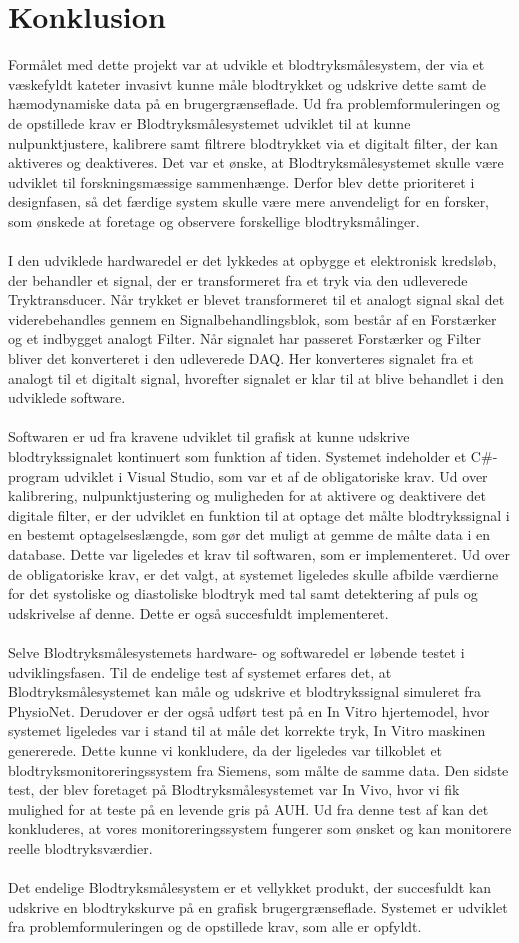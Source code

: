 \chapter{Konklusion}
Formålet med dette projekt var at udvikle et blodtryksmålesystem, der via et væskefyldt kateter invasivt kunne måle blodtrykket og udskrive dette samt de hæmodynamiske data på en brugergrænseflade. Ud fra problemformuleringen og de opstillede krav er Blodtryksmålesystemet udviklet til at kunne nulpunktjustere, kalibrere samt filtrere blodtrykket via et digitalt filter, der kan aktiveres og deaktiveres. 
Det var et ønske, at Blodtryksmålesystemet skulle være udviklet til forskningsmæssige sammenhænge. Derfor blev dette prioriteret i designfasen, så det færdige system skulle være mere anvendeligt for en forsker, som ønskede at foretage og observere forskellige blodtryksmålinger.\\\\
I den udviklede hardwaredel er det lykkedes at opbygge et elektronisk kredsløb, der behandler et signal, der er transformeret fra et tryk via den udleverede Tryktransducer. Når trykket er blevet transformeret til et analogt signal skal det viderebehandles gennem en Signalbehandlingsblok, som består af en Forstærker og et indbygget analogt Filter. Når signalet har passeret Forstærker og Filter bliver det konverteret i den udleverede DAQ. Her konverteres signalet fra et analogt til et digitalt signal, hvorefter signalet er klar til at blive behandlet i den udviklede software. \\\\
Softwaren er ud fra kravene udviklet til grafisk at kunne udskrive blodtrykssignalet kontinuert som funktion af tiden. Systemet indeholder et C\#-program udviklet i Visual Studio, som var et af de obligatoriske krav. Ud over kalibrering, nulpunktjustering og muligheden for at aktivere og deaktivere det digitale filter, er der udviklet en funktion til at optage det målte blodtrykssignal i en bestemt optagelseslængde, som gør det muligt at gemme de målte data i en database. Dette var ligeledes et krav til softwaren, som er implementeret. Ud over de obligatoriske krav, er det valgt, at systemet ligeledes skulle afbilde værdierne for det systoliske og diastoliske blodtryk med tal samt detektering af puls og udskrivelse af denne. Dette er også succesfuldt implementeret. \\\\
Selve Blodtryksmålesystemets hardware- og softwaredel er løbende testet i udviklingsfasen. Til de endelige test af systemet erfares det, at Blodtryksmålesystemet kan måle og udskrive et blodtrykssignal simuleret fra PhysioNet. Derudover er der også udført test på en In Vitro hjertemodel, hvor systemet ligeledes var i stand til at måle det korrekte tryk, In Vitro maskinen genererede. Dette kunne vi konkludere, da der ligeledes var tilkoblet et blodtryksmonitoreringssystem fra Siemens, som målte de samme data. Den sidste test, der blev foretaget på Blodtryksmålesystemet var In Vivo, hvor vi fik mulighed for at teste på en levende gris på AUH. Ud fra denne test af kan det konkluderes, at vores monitoreringssystem fungerer som ønsket og kan monitorere reelle blodtryksværdier.\\\\
Det endelige Blodtryksmålesystem er et vellykket produkt, der succesfuldt kan udskrive en blodtrykskurve på en grafisk brugergrænseflade. Systemet er udviklet fra problemformuleringen og de opstillede krav, som alle er opfyldt. 
